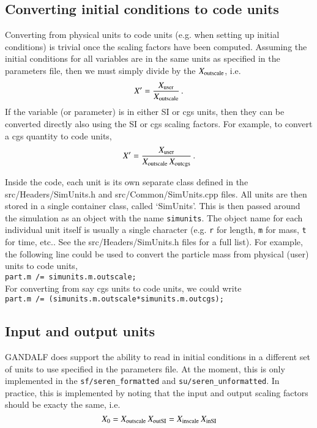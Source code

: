 \documentclass[a4paper]{article}
\newcommand{\var}[1]{\texttt{#1}}
\begin{document}
\subsection{Converting initial conditions to code units}
Converting from physical units to code units (e.g. when setting up initial conditions) is trivial once the scaling factors have been computed.  Assuming the initial conditions for all variables are in the same units as specified in the parameters file, then we must simply divide by the $X_{\rm outscale}$, i.e.
\begin{equation}
X' = \frac{X_{\rm user}}{X_{\rm outscale}}\,.
\end{equation}
If the variable (or parameter) is in either SI or cgs units, then they can be converted directly also using the SI or cgs scaling factors.  For example, to convert a cgs quantity to code units, 
\begin{equation}
X' = \frac{X_{\rm user}}{X_{\rm outscale}\,X_{\rm outcgs}}\,.
\end{equation}

Inside the code, each unit is its own separate class defined in the src/Headers/SimUnits.h and src/Common/SimUnits.cpp files.  All units are then stored in a single container class, called `SimUnits'.  This is then passed around the simulation as an object with the name \var{simunits}.  The object name for each individual unit itself is usually a single character (e.g. \var{r} for length, \var{m} for mass, \var{t} for time, etc..  See the src/Headers/SimUnits.h files for a full list).  For example, the following line could be used to convert the particle mass from physical (user) units to code units,  \\
\newline
\noindent \var{part.m /= simunits.m.outscale;} \\

\noindent For converting from say cgs units to code units, we could write \\
\newline
\noindent \var{part.m /= (simunits.m.outscale*simunits.m.outcgs);} \\





\subsection{Input and output units}
GANDALF does support the ability to read in initial conditions in a different set of units to use specified in the parameters file.  At the moment, this is only implemented in the \var{sf/seren\_formatted} and \var{su/seren\_unformatted}.  In practice, this is implemented by noting that the input and output scaling factors should be exacty the same, i.e.
\begin{equation}
X_0 = X_{\rm outscale} \, X_{\rm outSI} = X_{\rm inscale} \, X_{\rm inSI}
\end{equation}
\end{document}
